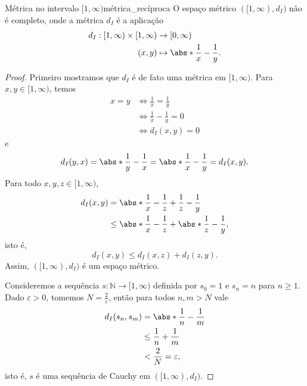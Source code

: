 \begin{proposition}{Métrica no intervalo \([1, \infty)\)}{métrica_recíproca}
    O espaço métrico \(([1,\infty), d_I)\) não é completo, onde a métrica \(d_I\) é a aplicação
    \begin{align*}
        d_I : [1,\infty) \times [1, \infty) &\to [0, \infty)\\
                                      (x,y) &\mapsto \abs*{\frac1x - \frac1y}.
    \end{align*}
\end{proposition}
\begin{proof}
    Primeiro mostramos que \(d_I\) é de fato uma métrica em \([1,\infty)\). Para \(x,y \in [1,\infty)\), temos
    \begin{align*}
        x = y &\iff \frac1x = \frac1y\\
              &\iff \frac{1}{x} - \frac1y = 0\\
              &\iff d_I(x,y) = 0
    \end{align*}
    e
    \begin{equation*}
        d_I(y,x) = \abs*{\frac1y - \frac1x} = \abs*{\frac1x - \frac1y} = d_I(x,y).
    \end{equation*}
    Para todo \(x,y,z \in [1,\infty)\),
    \begin{align*}
        d_I(x,y) &= \abs*{\frac1x - \frac1z + \frac1z - \frac1y}\\
                 &\leq \abs*{\frac1x - \frac1z} + \abs*{\frac1z - \frac1y},
    \end{align*}
    isto é,
    \begin{equation*}
        d_I(x,y) \leq d_I(x,z) + d_I(z,y).
    \end{equation*}
    Assim, \(([1,\infty), d_I)\) é um espaço métrico.

    Consideremos a sequência \(s : \mathbb{N} \to [1,\infty)\) definida por \(s_0 = 1\) e \(s_n = n\) para \(n \geq 1\). Dado \(\varepsilon > 0\), tomemos \(N = \frac{2}{\varepsilon}\), então para todos \(n,m > N\) vale
    \begin{align*}
        d_I(s_n, s_m) &= \abs*{\frac1{n} - \frac1{m}}\\
                      &\leq \frac{1}{n} + \frac{1}{m}\\
                      &< \frac{2}{N} = \varepsilon,
    \end{align*}
    isto é, \(s\) é uma sequência de Cauchy em \(([1,\infty), d_I)\).


\end{proof}

